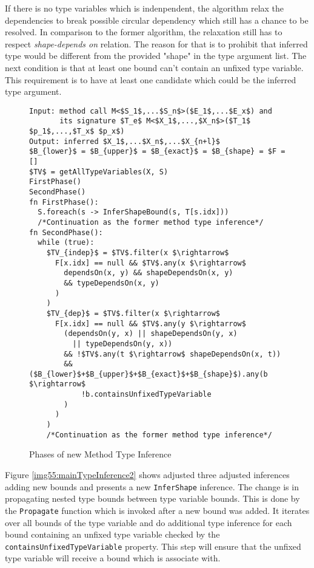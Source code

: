 If there is no type variables which is indenpendent, the algorithm relax the dependencies to break possible circular dependency which still has a chance to be resolved.
In comparison to the former algorithm, the relaxation still has to respect \textit{shape-depends on} relation.
The reason for that is to prohibit that inferred type would be different from the provided "shape" in the type argument list.
The next condition is that at least one bound can't contain an unfixed type variable.
This requirement is to have at least one candidate which could be the inferred type argument.
\begin{figure}[h!]
\begin{lstlisting}[style=myAlgo, mathescape=true]
Input: method call M<$S_1$,...$S_n$>($E_1$,...$E_x$) and 
       its signature $T_e$ M<$X_1$,...,$X_n$>($T_1$ $p_1$,...,$T_x$ $p_x$)
Output: inferred $X_1$,...$X_n$,...$X_{n+l}$
$B_{lower}$ = $B_{upper}$ = $B_{exact}$ = $B_{shape} = $F = []
$TV$ = getAllTypeVariables(X, S)
FirstPhase()
SecondPhase()
fn FirstPhase():
  S.foreach(s -> InferShapeBound(s, T[s.idx]))
  /*Continuation as the former method type inference*/
fn SecondPhase():
  while (true):
    $TV_{indep}$ = $TV$.filter(x $\rightarrow$ 
      F[x.idx] == null && $TV$.any(x $\rightarrow$ 
        dependsOn(x, y) && shapeDependsOn(x, y) 
        && typeDependsOn(x, y)
      )
    )
    $TV_{dep}$ = $TV$.filter(x $\rightarrow$
      F[x.idx] == null && $TV$.any(y $\rightarrow$ 
        (dependsOn(y, x) || shapeDependsOn(y, x) 
          || typeDependsOn(y, x)) 
        && !$TV$.any(t $\rightarrow$ shapeDependsOn(x, t))
        && ($B_{lower}$+$B_{upper}$+$B_{exact}$+$B_{shape}$).any(b $\rightarrow$ 
            !b.containsUnfixedTypeVariable
        )
      )
    )
    /*Continuation as the former method type inference*/
\end{lstlisting}
\caption{Phases of new Method Type Inference}
\label{img54:mainTypeInference1}
\end{figure}
\par
Figure \ref{img55:mainTypeInference2} shows adjusted three adjusted inferences adding new bounds and presents a new \texttt{InferShape} inference.
The change is in propagating nested type bounds between type variable bounds.
This is done by the \texttt{Propagate} function which is invoked after a new bound was added.
It iterates over all bounds of the type variable and do additional type inference for each bound containing an unfixed type variable checked by the \texttt{containsUnfixedTypeVariable} property.
This step will ensure that the unfixed type variable will receive a bound which is associate with.
